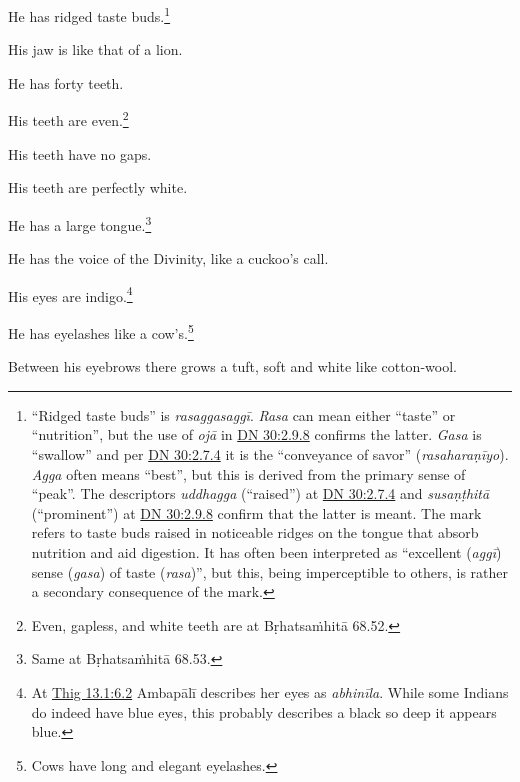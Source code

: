 \documentclass[12pt,openany]{book}%
\begin{document}
He has ridged taste buds.\footnote{“Ridged taste buds” is \textit{\textsanskrit{rasaggasaggī}}. \textit{Rasa} can mean either “taste” or “nutrition”, but the use of \textit{\textsanskrit{ojā}} in \href{https://suttacentral.net/dn30/en/sujato\#2.9.8}{DN 30:2.9.8} confirms the latter. \textit{Gasa} is “swallow” and per \href{https://suttacentral.net/dn30/en/sujato\#2.7.4}{DN 30:2.7.4} it is the “conveyance of savor” (\textit{\textsanskrit{rasaharaṇīyo}}). \textit{Agga} often means “best”, but this is derived from the primary sense of “peak”. The descriptors \textit{uddhagga} (“raised”) at \href{https://suttacentral.net/dn30/en/sujato\#2.7.4}{DN 30:2.7.4} and \textit{\textsanskrit{susaṇṭhitā}} (“prominent”) at \href{https://suttacentral.net/dn30/en/sujato\#2.9.8}{DN 30:2.9.8} confirm that the latter is meant. The mark refers to taste buds raised in noticeable ridges on the tongue that absorb nutrition and aid digestion. It has often been interpreted as “excellent (\textit{\textsanskrit{aggī}}) sense (\textit{gasa}) of taste (\textit{rasa})”, but this, being imperceptible to others, is rather a secondary consequence of the mark. } 

His jaw is like that of a lion. 

He has forty teeth. 

His teeth are even.\footnote{Even, gapless, and white teeth are at \textsanskrit{Bṛhatsaṁhitā} 68.52. } 

His teeth have no gaps. 

His teeth are perfectly white. 

He has a large tongue.\footnote{Same at \textsanskrit{Bṛhatsaṁhitā} 68.53. } 

He has the voice of the Divinity, like a cuckoo’s call. 

His eyes are indigo.\footnote{At \href{https://suttacentral.net/thig13.1/en/sujato\#6.2}{Thig 13.1:6.2} \textsanskrit{Ambapālī} describes her eyes as \textit{\textsanskrit{abhinīla}}. While some Indians do indeed have blue eyes, this probably describes a black so deep it appears blue. } 

He has eyelashes like a cow’s.\footnote{Cows have long and elegant eyelashes. } 

Between his eyebrows there grows a tuft, soft and white like cotton-wool. 
\end{document}
